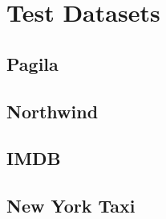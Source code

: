 \section{Test Datasets}
\lipsum[1-2]
\subsection{Pagila}
\lipsum[3-4]
\subsection{Northwind}
\lipsum[5-6]
\subsection{IMDB}
\lipsum[7-8]
\subsection{New York Taxi}
\lipsum[9-10]